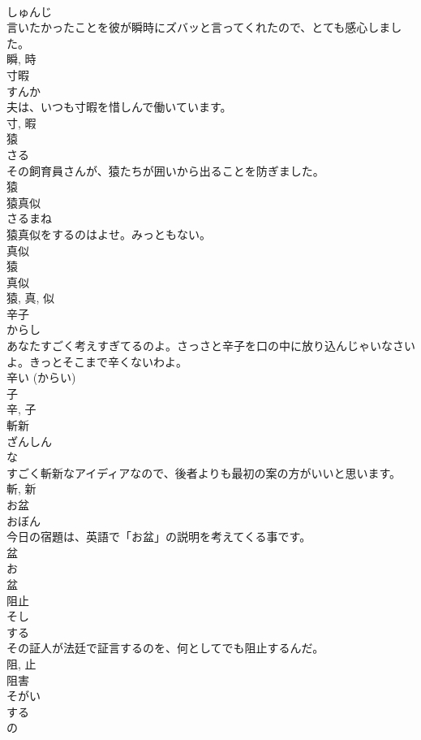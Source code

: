 \documentclass[8pt]{extreport}
\begin{document}
\begin{CJK}{UTF8}{min}
\\	しゅんじ	
\\	言いたかったことを彼が瞬時にズバッと言ってくれたので、とても感心しました。	
\\	瞬, 時	
\\	寸暇	
\\	すんか	
\\	夫は、いつも寸暇を惜しんで働いています。	
\\	寸, 暇	
\\	猿	
\\	さる	
\\	その飼育員さんが、猿たちが囲いから出ることを防ぎました。	
\\	猿	
\\	猿真似	
\\	さるまね	
\\	猿真似をするのはよせ。みっともない。	
\\	真似 
\\	猿 
\\	真似 
\\	猿, 真, 似	
\\	辛子	
\\	からし	
\\	あなたすごく考えすぎてるのよ。さっさと辛子を口の中に放り込んじゃいなさいよ。きっとそこまで辛くないわよ。	
\\	辛い (からい) 
\\	子 
\\	辛, 子	
\\	斬新	
\\	ざんしん	
\\	な 
\\	すごく斬新なアイディアなので、後者よりも最初の案の方がいいと思います。	
\\	斬, 新	
\\	お盆	
\\	おぼん	
\\	今日の宿題は、英語で「お盆」の説明を考えてくる事です。	
\\	盆 
\\	お 
\\	盆	
\\	阻止	
\\	そし	
\\	する 
\\	その証人が法廷で証言するのを、何としてでも阻止するんだ。	
\\	阻, 止	
\\	阻害	
\\	そがい	
\\	する 
\\	の 

\end{CJK}
\end{document}
